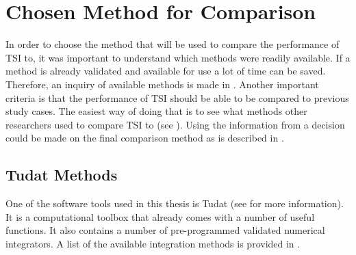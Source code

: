 \section{Chosen Method for Comparison}
\label{sec:chosenMethodForComparison}
In order to choose the method that will be used to compare the performance of \ac{TSI} to, it was important to understand which methods were readily available. If a method is already validated and available for use a lot of time can be saved. Therefore, an inquiry of available methods is made in . Another important criteria is that the performance of \ac{TSI} should be able to be compared to previous study cases. The easiest way of doing that is to see what methods other researchers used to compare \ac{TSI} to (see ). Using the information from  a decision could be made on the final comparison method as is described in .

\subsection{\acl{Tudat} Methods}
\label{subsec:tudatMethods}
One of the software tools used in this thesis is \acf{Tudat} (see  for more information). It is a computational toolbox that already comes with a number of useful functions. It also contains a number of pre-programmed validated numerical integrators. A list of the available integration methods is provided in .


